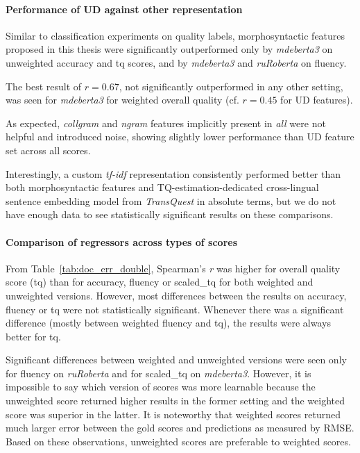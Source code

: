 \paragraph{\label{pg:doc_err_ud_vs_all}Performance of UD against other representation}
Similar to classification experiments on quality labels, morphosyntactic features proposed in this thesis were significantly outperformed only by \textit{mdeberta3} on unweighted accuracy and tq scores, and by \textit{mdeberta3} and \textit{ruRoberta} on fluency.

The best result of $r=0.67$, not significantly outperformed in any other setting, was seen for \textit{mdeberta3} for weighted overall quality (cf. $r=0.45$ for UD features). 

As expected, \textit{collgram} and \textit{ngram} features implicitly present in \textit{all} were not helpful and introduced noise, showing slightly lower performance than UD feature set across all scores.

Interestingly, a custom \textit{tf-idf} representation consistently performed better than both morphosyntactic features and TQ-estimation-dedicated cross-lingual sentence embedding model from \textit{TransQuest} in absolute terms, but we do not have enough data to see statistically significant results on these comparisons.

\paragraph{Comparison of regressors across types of scores}
From Table~\ref{tab:doc_err_double}, Spearman's \textit{r} was higher for overall quality score (tq) than for accuracy, fluency or scaled\_tq for both weighted and unweighted versions. However, most differences between the results on accuracy, fluency or tq were not statistically significant. Whenever there was a significant difference (mostly between weighted fluency and tq), the results were always better for tq.

Significant differences between weighted and unweighted versions were seen only for fluency on \textit{ruRoberta} and for scaled\_tq on \textit{mdeberta3}. However, it is impossible to say which version of scores was more learnable because the unweighted score returned higher results in the former setting and the weighted score was superior in the latter. 
It is noteworthy that weighted scores returned much larger error between the gold scores and predictions as measured by \gls{RMSE}. 
Based on these observations, {unweighted scores are preferable to weighted scores}.

